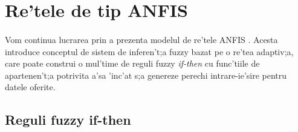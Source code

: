 \section {Re'tele de tip ANFIS}

\paragraph{}

Vom continua lucrarea prin a prezenta modelul de re'tele ANFIS \cite{anfis}. Acesta introduce conceptul de sistem de inferen't;a fuzzy bazat pe o re'tea adaptiv;a, care poate construi o mul'time de reguli fuzzy \textit{if-then} cu func'tiile de apartenen't;a potrivita a'sa 'inc'at s;a genereze perechi intrare-ie'sire pentru datele oferite. 
\par
\subsection{Reguli fuzzy if-then}
